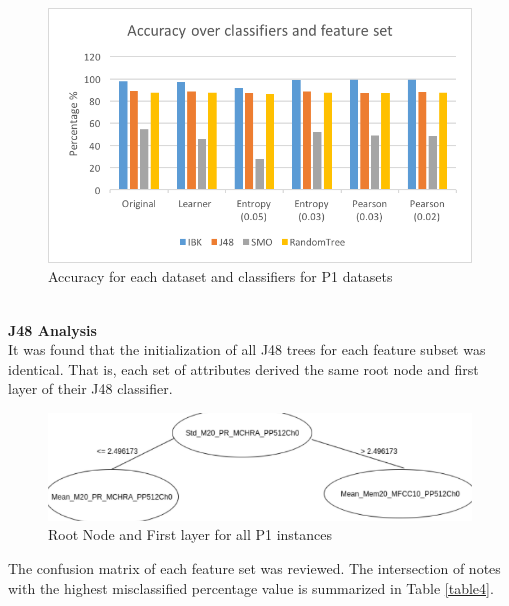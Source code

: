 \documentclass{article}
\begin{document}
\begin{figure}[h]
\includegraphics[scale=.65]{accuracy_p1}
 \caption{Accuracy for each dataset and classifiers for P1 datasets}
\label{figure2}
\end{figure}
\\\textbf{J48 Analysis}\\
It was found that the initialization of all J48 trees for each feature subset was identical. That is, each set of attributes derived the same root node and first layer of their J48 classifier. 
\begin{figure}[h]
\includegraphics[scale=.35]{treenotes}
 \caption{Root Node and First layer for all P1 instances}
\label{figure3}
\end{figure}

The confusion matrix of each feature set was reviewed. The intersection of notes with the highest misclassified percentage value is summarized in Table \ref{table4}.
\end{document}
